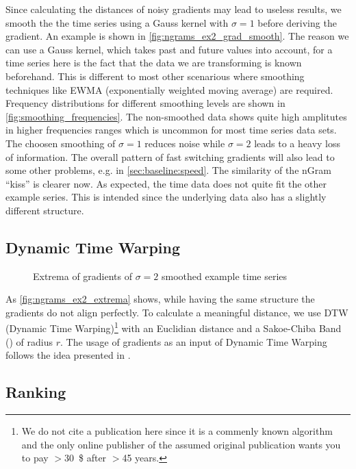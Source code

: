 Since calculating the distances of noisy gradients may lead to useless results, we smooth the the time series using a Gauss kernel with $\sigma = 1$ before deriving the gradient. An example is shown in \autoref{fig:ngrams_ex2_grad_smooth}. The reason we can use a Gauss kernel, which takes past and future values into account, for a time series here is the fact that the data we are transforming is known beforehand. This is different to most other scenarious where smoothing techniques like EWMA (exponentially weighted moving average) are required. Frequency distributions for different smoothing levels are shown in \autoref{fig:smoothing_frequencies}. The non-smoothed data shows quite high amplitutes in higher frequencies ranges which is uncommon for most time series data sets. The choosen smoothing of $\sigma = 1$ reduces noise while $\sigma = 2$ leads to a heavy loss of information. The overall pattern of fast switching gradients will also lead to some other problems, e.g. in \autoref{sec:baseline:speed}. The similarity of the nGram \enquote{kiss} is clearer now. As expected, the time data does not quite fit the other example series. This is intended since the underlying data also has a slightly different structure.


\subsection{Dynamic Time Warping}
\label{ssec:baseline:sim:dtw}

\begin{figure}
    \centering
    
    \caption{Extrema of gradients of $\sigma = 2$ smoothed example time series}
    \label{fig:ngrams_ex2_extrema}
\end{figure}

As \autoref{fig:ngrams_ex2_extrema} shows, while having the same structure the gradients do not align perfectly. To calculate a meaningful distance, we use DTW (Dynamic Time Warping)\footnote{We do not cite a publication here since it is a commenly known algorithm and the only online publisher of the assumed original publication wants you to pay $>$\SI{30}{\$} after $>$\num{45} years.} with an Euclidian distance and a Sakoe-Chiba Band (\cite{sakoe}) of radius $r$. The usage of gradients as an input of Dynamic Time Warping follows the idea presented in \cite{DDTW}.


\subsection{Ranking}
\label{ssec:baseline:sim:rank}

